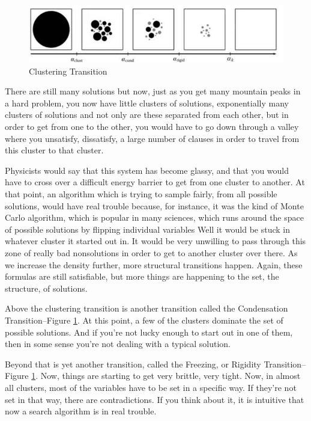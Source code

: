 \documentclass[]{article}
\begin{document}
\begin{figure}[H]
	\caption{Clustering	Transition}\label{fig:clustering-transition}
	\includegraphics[width=\textwidth]{clustering-transition}
\end{figure}

There are still many solutions but now, just as you get many mountain peaks in a hard problem, you now have little clusters of solutions, exponentially many clusters of solutions and not only are these separated from each other, but in order to get from one to the other, you would have to go down through a valley where you unsatisfy, dissatisfy, a large number of clauses in order to travel from this cluster to that cluster.

Physicists would say that this system has become glassy, and that you would have to cross over a difficult energy barrier to get from one cluster to another.
At that point, an algorithm which is trying to sample fairly, from all possible solutions, would have real trouble because, for instance, it was the kind of Monte Carlo algorithm, which is popular in many sciences, which runs around the space of possible solutions by flipping individual variables
Well it would be stuck in whatever cluster it started out in.
It would be very unwilling to pass through this zone of really bad nonsolutions in order to get to another cluster over there.
As we increase the density further, more structural transitions happen.
Again, these formulas are still satisfiable, but more things are happening to the set,
the structure, of solutions.

Above the clustering transition is another transition called the Condensation Transition--Figure \ref{fig:clustering-transition}.
At this point, a few of the clusters
dominate the set of possible solutions.
And if you're not lucky enough to start
out in one of them,
then in some sense you're not dealing
with a typical solution.

Beyond that is yet another transition, called the Freezing,
or Rigidity Transition--Figure \ref{fig:clustering-transition}.
Now, things are starting to get 
very brittle,
very tight.
Now, in almost all clusters,
most of the variables have to be set in
a specific way.
If they're not set in that way, there are
contradictions.
If you think about it, it is intuitive
that now a search algorithm
is in real trouble.
\end{document}
